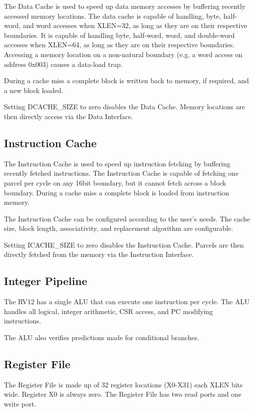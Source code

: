 The Data Cache is used to speed up data memory accesses by buffering
recently accessed memory locations. The data cache is capable of
handling, byte, half-word, and word accesses when XLEN=32, as long as
they are on their respective boundaries. It is capable of handling byte,
half-word, word, and double-word accesses when XLEN=64, as long as they
are on their respective boundaries. Accessing a memory location on a
non-natural boundary (e.g. a word access on address 0x003) causes a
data-load trap.

During a cache miss a complete block is written back to memory, if
required, and a new block loaded.

Setting DCACHE\_SIZE to zero disables the Data Cache. Memory locations
are then directly access via the Data Interface.

\subsection{Instruction Cache}\label{instruction-cache}

The Instruction Cache is used to speed up instruction fetching by
buffering recently fetched instructions. The Instruction Cache is
capable of fetching one parcel per cycle on any 16bit boundary, but it
cannot fetch across a block boundary. During a cache miss a complete
block is loaded from instruction memory.

The Instruction Cache can be configured according to the user's needs.
The cache size, block length, associativity, and replacement algorithm
are configurable.

Setting ICACHE\_SIZE to zero disables the Instruction Cache. Parcels are
then directly fetched from the memory via the Instruction Interface.

\subsection{Integer Pipeline}\label{integer-pipeline}

The RV12 has a single ALU that can execute one instruction per cycle.
The ALU handles all logical, integer arithmetic, CSR access, and PC
modifying instructions.

The ALU also verifies predictions made for conditional branches.

\subsection{Register File}\label{register-file}

The Register File is made up of 32 register locations (X0-X31) each XLEN
bits wide. Register X0 is always zero. The Register File has two read
ports and one write port.